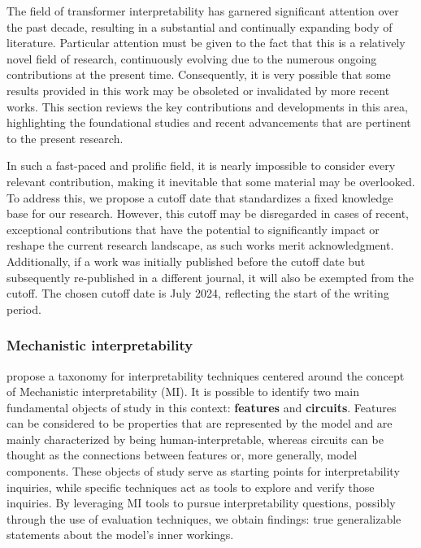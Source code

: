 The field of transformer interpretability has garnered significant attention over the past decade, resulting in a substantial and continually expanding body of literature.
Particular attention must be given to the fact that this is a relatively novel field of research, continuously evolving due to the numerous ongoing contributions at the present time.
Consequently, it is very possible that some results provided in this work may be obsoleted or invalidated by more recent works.
This section reviews the key contributions and developments in this area, highlighting the foundational studies and recent advancements that are pertinent to the present research.

In such a fast-paced and prolific field, it is nearly impossible to consider every relevant contribution, making it inevitable that some material may be overlooked.
To address this, we propose a cutoff date that standardizes a fixed knowledge base for our research.
However, this cutoff may be disregarded in cases of recent, exceptional contributions that have the potential to significantly impact or reshape the current research landscape, as such works merit acknowledgment.
Additionally, if a work was initially published before the cutoff date but subsequently re-published in a different journal, it will also be exempted from the cutoff.
The chosen cutoff date is July 2024, reflecting the start of the writing period.

\subsubsection*{Mechanistic interpretability}

\citet{rai2024} propose a taxonomy for interpretability techniques centered around the concept of Mechanistic interpretability (MI).
It is possible to identify two main fundamental objects of study in this context: \textbf{features} and \textbf{circuits}.
Features can be considered to be properties that are represented by the model and are mainly characterized by being human-interpretable, whereas circuits can be thought as the connections between features or, more generally, model components.
These objects of study serve as starting points for interpretability inquiries, while specific techniques act as tools to explore and verify those inquiries.
By leveraging MI tools to pursue interpretability questions, possibly through the use of evaluation techniques, we obtain findings: true generalizable statements about the model's inner workings.

